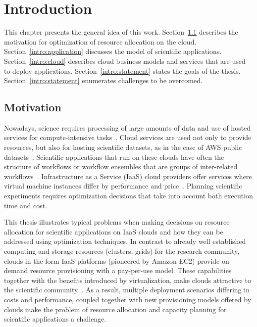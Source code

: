 \chapter{Introduction}
\label{chap:introduction} 

This chapter presents the general idea of this work. Section~\ref{intro:motivation} describes the motivation for optimization of resource allocation on the cloud. Section~\ref{intro:application} discusses the model of scientific applications. Section~\ref{intro:cloud} describes cloud business models and services that are used to deploy applications. Section~\ref{intro:statement} states the goals of the thesis. Section~\ref{intro:statement} enumerates challenges to be overcomed. 

\section{Motivation}
\label{intro:motivation}

Nowadays, science requires processing of large amounts of data and use of hosted services for compute-intensive tasks~\cite{Deelman-PPL13}. Cloud services are used not only to provide resources, but also for hosting scientific datasets, as in the case of AWS public datasets~\cite{AWS-public-dataset}. Scientific applications that run on these clouds have often the structure of workflows or workflow ensembles that are groups of inter-related workflows~\cite{Malawski-SC12}. Infrastructure as a Service (IaaS) cloud providers offer services where virtual machine instances differ by performance and price~\cite{Bubak-CCGrid13}. Planning scientific experiments requires optimization decisions that take into account both execution time and cost.

This thesis illustrates typical problems when making decisions on resource allocation for scientific applications on IaaS clouds and how they can be addressed using optimization techniques. In contrast to already well established computing and storage resources (clusters, grids) for the research community, clouds in the form IaaS  platforms (pioneered by Amazon EC2) provide on-demand resource provisioning with a pay-per-use model. These capabilities together with the benefits introduced by virtualization, make clouds attractive to the scientific community~\cite{Deelman09}. As a result, multiple deployment scenarios differing in costs and performance, coupled together with new provisioning models offered by clouds make the problem of resource allocation and capacity planning for scientific applications a challenge.


